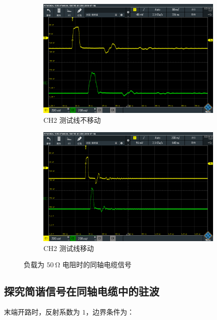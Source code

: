 \documentclass{customDoc}
\begin{document}
\begin{figure}[H]
\begin{subfigure}[b]{0.45\textwidth}
    \centering
    \includegraphics[width=\textwidth]{SCR05.PNG}
    \caption{CH2 测试线不移动}
    \label{fig:load_50_1}
\end{subfigure}
\hfill
\begin{subfigure}[b]{0.45\textwidth}
    \centering
    \includegraphics[width=\textwidth]{SCR06.PNG}
    \caption{CH2 测试线移动}
    \label{fig:load_50_2}
\end{subfigure}
\centering
\caption{负载为 $\SI{50}{\ohm}$ 电阻时的同轴电缆信号}
\end{figure}

\subsection{探究简谐信号在同轴电缆中的驻波}

末端开路时，反射系数为 $1$，边界条件为：
\end{document}
